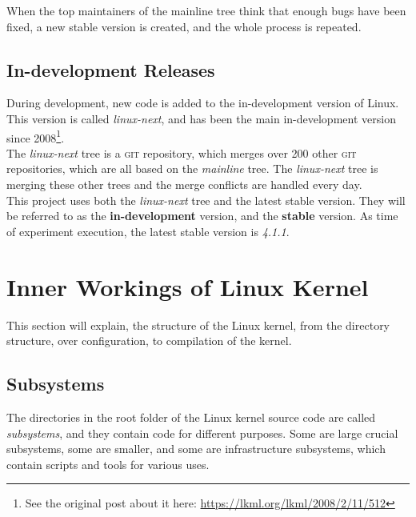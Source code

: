 \documentclass[a4paper,11pt]{report}
\newcommand{\f}{\footnote{\fn}}
\newcommand{\figa}{
    \begin{figure}[!htpb]
    \centering
}
\newcommand{\figb}[2]{
    \caption{#1}
    \label{#2}
    \end{figure}
}
\begin{document}
When the top maintainers of the mainline tree think that enough bugs have been 
fixed, a new stable version is created, and the whole process is repeated.


            \subsection*{In-development Releases}

            \def \fn {See the original post about it here: 
            \url{https://lkml.org/lkml/2008/2/11/512}}

During development, new code is added to the in-development version of Linux.
This version is called \emph{linux-next}, and has been the main in-development version
since 2008\f.
\\

The \emph{linux-next} tree is a \textsc{git} repository, which 
merges over 200 other \textsc{git} repositories\cite
    {nextTrees},
which are all based on the \emph{mainline} tree. The \emph{linux-next} tree is 
merging these other trees and the merge conflicts are handled every day.
\\

This project uses both the \emph{linux-next} tree and the latest stable 
version. They will be referred to as the \textbf{in-development} 
version, and the \textbf{stable} version. As time of experiment execution, the 
latest stable version is \emph{4.1.1}.


    \section{Inner Workings of Linux Kernel}

This section will explain, the structure of the Linux kernel, from the 
directory structure, over configuration, to compilation of the kernel.


            \subsection{Subsystems}
            \label{sec:linuxss}

The directories in the root folder of the Linux kernel source code are called 
\emph{subsystems}, and they contain code for different purposes. Some are large 
crucial subsystems, some are smaller, and some are infrastructure 
subsystems, which contain scripts and tools for various uses\cite{42bugs}.
\\
\end{document}
